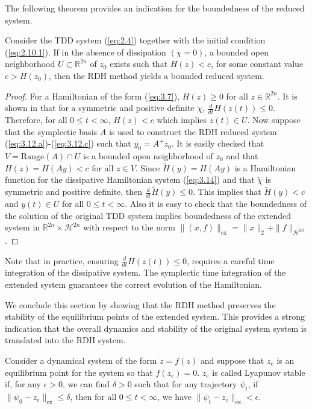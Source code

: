 {\edit The following theorem provides an indication for the boundedness of the reduced system.
\begin{theorem}
Consider the TDD system (\ref{eq:2.4}) together with the initial condition (\ref{eq:2.10.1}). If in the absence of dissipation $(\chi = 0)$, a bounded open neighborhood $U\subset \mathbb R^{2n}$ of $z_0$ exists such that $H(z)<c$, for some constant value $c > H(z_0)$, then the RDH method yields a bounded reduced system.
\end{theorem}
\begin{proof} For a Hamiltonian of the form (\ref{eq:3.7}), $H(z)\geq 0$ for all $z\in \mathbb R^{2n}$. It is shown in \cite{Figotin:2005,Figotin:2006jy} that for a symmetric and positive definite $\chi$, $\frac d {dt} H(z(t)) \leq 0$. Therefore, for all $0\leq t <\infty$, $H(z) < c$ which implies $z(t) \in U$. Now suppose that the symplectic basis $A$ is used to construct the RDH reduced system (\ref{eq:3.12.a})-(\ref{eq:3.12.c}) such that $y_0 = A^+z_0$. It is easily checked that $V = \text{Range}(A)\cap U$ is a bounded open neighborhood of $z_0$ and that $H(z) = H(Ay) < c$ for all $z \in V$. Since $\tilde H(y) = H(Ay)$ is a Hamiltonian function for the dissipative Hamiltonian system (\ref{eq:3.14}) and that $\tilde \chi$ is symmetric and positive definite, then $\frac d {dt} \tilde H(y) \leq0$. This implies that $\tilde H(y)<c$ and $y(t)\in U$ for all $0\leq t <\infty$. Also it is easy to check that the boundedness of the solution of the original TDD system implies boundedness of the extended system in $\mathbb R^{2n}\times \mathcal H^{2n}$ with respect to the norm $\| (x,f) \|_{\text{ex}} = \|x\|_2 + \| f \|_{\mathcal H ^{2n}}$.
\end{proof}

Note that in practice, ensuring $\frac d {dt} H(z(t)) \leq 0$, requires a careful time integration of the dissipative system. The symplectic time integration of the extended system guarantees the correct evolution of the Hamiltonian.

We conclude this section by showing that the RDH method preserves the stability of the equilibrium points of the extended system. This provides a strong indication that the overall dynamics and stability of the original system system is translated into the RDH system. 

\begin{definition}
Consider a dynamical system of the form $\dot z = f( z)$ and suppose that $z_e$ is an equilibrium point for the system so that $ f( z_e) = 0$. $z_e$ is called Lyapunov stable if, for any $\epsilon > 0$, we can find $\delta > 0$ such that for any trajectory $\psi_t$, if $\| \psi_0 - z_e \|_{\text{ex}} \leq \delta$, then for all $0 \leq t < \infty$, we have $\| \psi_t - z_e \|_{\text{ex}} < \epsilon$.
\end{definition}

}
